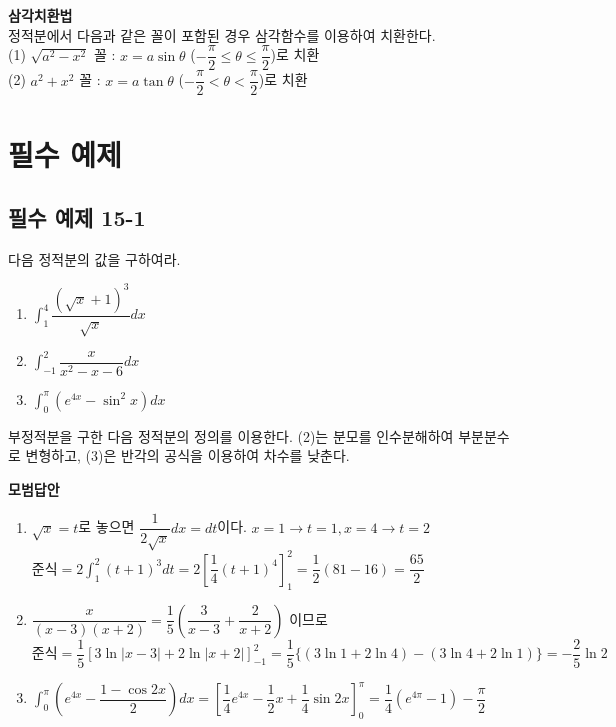 \documentclass[a4paper,11pt]{article}
\begin{document}
\begin{advicebox}
\textbf{삼각치환법}\\
정적분에서 다음과 같은 꼴이 포함된 경우 삼각함수를 이용하여 치환한다.\\
(1) $\sqrt{a^2-x^2}$ 꼴 : $x = a \sin \theta$ ($-\dfrac{\pi}{2} \le \theta \le \dfrac{\pi}{2}$)로 치환\\
(2) $a^2+x^2$ 꼴 : $x = a \tan \theta$ ($-\dfrac{\pi}{2} < \theta < \dfrac{\pi}{2}$)로 치환
\end{advicebox}

\newpage

\section*{필수 예제}

\subsection*{필수 예제 15-1}
다음 정적분의 값을 구하여라.
\begin{enumerate}[label=(\arabic*)]
    \item $\displaystyle\int_{1}^{4} \dfrac{(\sqrt{x}+1)^3}{\sqrt{x}} dx$ \\
    \item $\displaystyle\int_{-1}^{2} \dfrac{x}{x^2-x-6} dx$ \\
    \item $\displaystyle\int_{0}^{\pi} (e^{4x} - \sin^2 x) dx$ 
\end{enumerate}

\begin{studybox}
부정적분을 구한 다음 정적분의 정의를 이용한다. (2)는 분모를 인수분해하여 부분분수로 변형하고, (3)은 반각의 공식을 이용하여 차수를 낮춘다.
\end{studybox}

\textbf{모범답안}
\begin{enumerate}[label=(\arabic*)]
    \item $\sqrt{x}=t$로 놓으면 $\dfrac{1}{2\sqrt{x}}dx=dt$이다. $x=1 \to t=1, x=4 \to t=2$\\
    $\text{준식} = 2 \int_{1}^{2} (t+1)^3 dt = 2 \left[ \dfrac{1}{4}(t+1)^4 \right]_{1}^{2} = \dfrac{1}{2}(81-16) = \dfrac{65}{2}$
    \item $\dfrac{x}{(x-3)(x+2)} = \dfrac{1}{5} \left( \dfrac{3}{x-3} + \dfrac{2}{x+2} \right)$ 이므로\\
    $\text{준식} = \dfrac{1}{5} [3\ln|x-3| + 2\ln|x+2|]_{-1}^{2} = \dfrac{1}{5} \{(3\ln 1 + 2\ln 4) - (3\ln 4 + 2\ln 1)\} = -\dfrac{2}{5}\ln 2$
    \item $\int_{0}^{\pi} (e^{4x} - \dfrac{1-\cos 2x}{2}) dx = \left[ \dfrac{1}{4}e^{4x} - \dfrac{1}{2}x + \dfrac{1}{4}\sin 2x \right]_{0}^{\pi} = \dfrac{1}{4}(e^{4\pi}-1) - \dfrac{\pi}{2}$
\end{enumerate}
\end{document}
